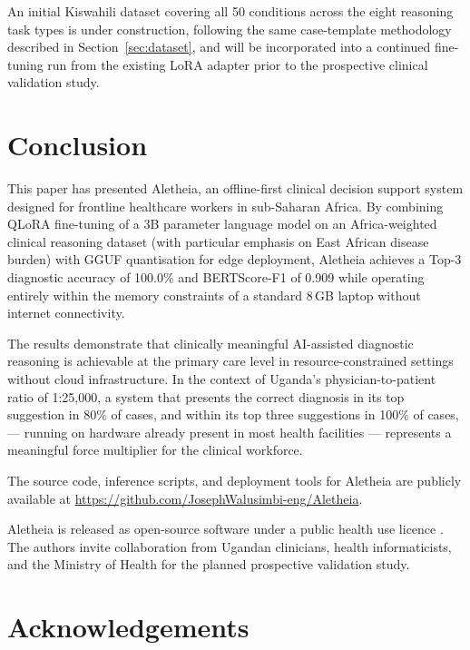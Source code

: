 \documentclass[journal]{IEEEtran}
\begin{document}
An initial Kiswahili dataset covering all 50 conditions across
the eight reasoning task types is under construction, following
the same case-template methodology described in
Section~\ref{sec:dataset}, and will be incorporated into a
continued fine-tuning run from the existing LoRA adapter prior to
the prospective clinical validation study.

\section{Conclusion}
\label{sec:conclusion}

This paper has presented Aletheia, an offline-first clinical
decision support system designed for frontline healthcare workers
in sub-Saharan Africa. By combining QLoRA fine-tuning of a 3B
parameter language model on an Africa-weighted clinical reasoning dataset
(with particular emphasis on East African disease burden) with GGUF quantisation for edge deployment,
Aletheia achieves a Top-3 diagnostic accuracy of 100.0\% and
BERTScore-F1 of 0.909 while operating entirely within the memory
constraints of a standard 8\,GB laptop without internet
connectivity.

The results demonstrate that clinically meaningful AI-assisted
diagnostic reasoning is achievable at the primary care level in
resource-constrained settings without cloud infrastructure. In
the context of Uganda's physician-to-patient ratio of 1:25{,}000,
a system that presents the correct diagnosis in its top suggestion
in 80\% of cases, and within its top three suggestions in 100\% of cases, --- running on hardware already present in most
health facilities --- represents a meaningful force multiplier for
the clinical workforce.

The source code, inference scripts, and deployment tools for
Aletheia are publicly available at
\url{https://github.com/JosephWalusimbi-eng/Aletheia}.

Aletheia is released as open-source software under a public
health use licence \cite{aletheia_github}. The authors invite collaboration from Ugandan
clinicians, health informaticists, and the Ministry of Health for
the planned prospective validation study.

\section*{Acknowledgements}
\end{document}
